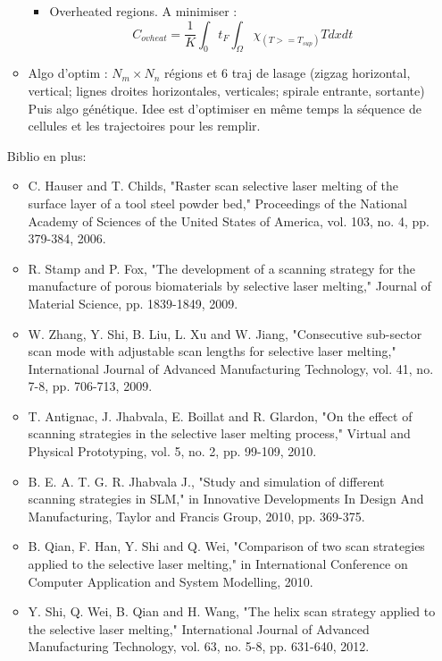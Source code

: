 \documentclass[11pt,a4paper]{article}
\begin{document}
\begin{itemize}
\begin{itemize}
\begin{itemize}
			\item Overheated regions. A minimiser :
			\begin{equation}
			C_{ovheat}=\frac{1}{K}\int_{0}{t_F}\int_{\Omega}\chi_{(T>=T_{sup})}Tdxdt
			\end{equation}
		\end{itemize}
		
		\item Algo d'optim : $N_m\times N_n$ régions et 6 traj de lasage (zigzag horizontal, vertical; lignes droites horizontales, verticales; spirale entrante, sortante)
		Puis algo génétique. Idee est d'optimiser en même temps la séquence de cellules et les trajectoires pour les remplir.
		
	\end{itemize}
	
	Biblio en plus:
	\begin{itemize}
		\item C. Hauser and T. Childs, "Raster scan selective laser melting of the surface layer of a tool steel powder bed," Proceedings of the National Academy of Sciences of the United States of America, vol. 103, no. 4, pp. 379-384, 2006.
		\item R. Stamp and P. Fox, "The development of a scanning strategy for the manufacture of porous biomaterials by selective laser melting," Journal of Material Science, pp. 1839-1849, 2009.
		\item W. Zhang, Y. Shi, B. Liu, L. Xu and W. Jiang, "Consecutive sub-sector scan mode with adjustable scan lengths for selective laser melting," International Journal of Advanced Manufacturing Technology, vol. 41, no. 7-8, pp. 706-713, 2009.
		\item T. Antignac, J. Jhabvala, E. Boillat and R. Glardon, "On the effect of scanning strategies in the selective laser melting process," Virtual and Physical Prototyping, vol. 5, no. 2, pp. 99-109, 2010.
		\item B. E. A. T. G. R. Jhabvala J., "Study and simulation of different scanning strategies in SLM," in Innovative Developments In Design And Manufacturing, Taylor and Francis Group, 2010, pp. 369-375.
		\item B. Qian, F. Han, Y. Shi and Q. Wei, "Comparison of two scan strategies applied to the selective laser melting," in International Conference on Computer Application and System Modelling, 2010.
		\item Y. Shi, Q. Wei, B. Qian and H. Wang, "The helix scan strategy applied to the selective laser melting," International Journal of Advanced Manufacturing Technology, vol. 63, no. 5-8, pp. 631-640, 2012.
	\end{itemize}
	

\end{itemize}
\end{document}
